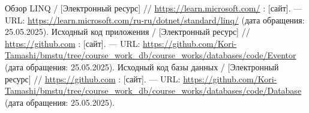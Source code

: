 \begin{thebibliography}{}
	  Обзор LINQ /  [Электронный ресурс] // \url{https://learn.microsoft.com/} : [сайт]. — URL: \url{https://learn.microsoft.com/ru-ru/dotnet/standard/linq/} (дата обращения: 25.05.2025).
	 Исходный код приложения /  [Электронный ресурс] // \url{https://github.com} : [сайт]. — URL: \url{https://github.com/Kori-Tamashi/bmstu/tree/course_work_db/course_works/databases/code/Eventor} (дата обращения: 25.05.2025).
	 Исходный код базы данных /  [Электронный ресурс] // \url{https://github.com} : [сайт]. — URL: \url{https://github.com/Kori-Tamashi/bmstu/tree/course_work_db/course_works/databases/code/Database} (дата обращения: 25.05.2025).
\end{thebibliography}

